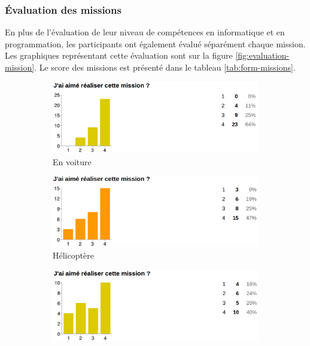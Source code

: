 \subsubsection{Évaluation des missions}
\label{appreciation}
En plus de l'évaluation de leur niveau de compétences en informatique et en programmation, les participants ont également évalué séparément chaque mission. Les graphiques représentant cette évaluation sont sur la figure \ref{fig:evaluation-mission}. Le score des \glspl{mission} est présenté dans le tableau \ref{tab:form-missions}.
\begin{figure}
  \begin{center}
    \begin{subfigure}{.49\textwidth}
      \includegraphics[width=\textwidth]{content/8-validation/images/voiture}
      \caption{En voiture}
    \end{subfigure}
    \begin{subfigure}{.49\textwidth}
      \includegraphics[width=\textwidth]{content/8-validation/images/helico}
      \caption{Hélicoptère}
    \end{subfigure}
    \begin{subfigure}{.49\textwidth}
      \includegraphics[width=\textwidth]{content/8-validation/images/courtois}

\end{subfigure}
\end{center}
\end{figure}
